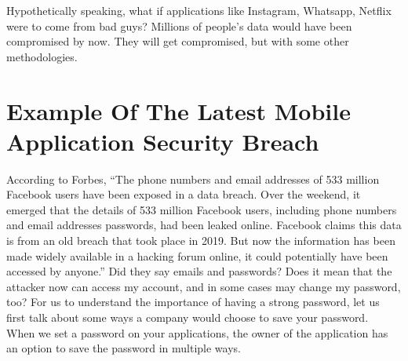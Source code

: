 \documentclass{article}
\begin{document}
Hypothetically speaking, what if applications like Instagram, Whatsapp, Netflix were to come from bad guys? Millions of people’s data would have been compromised by now. They will get compromised, but with some other methodologies.\\

\section{Example Of The Latest Mobile Application Security Breach}
According to Forbes, “The phone numbers and email addresses of 533 million Facebook users have been exposed in a data breach. Over the weekend, it emerged that the details of 533 million Facebook users, including phone numbers and email addresses passwords, had been leaked online. Facebook claims this data is from an old breach that took place in 2019. But now the information has been made widely available in a hacking forum online, it could potentially have been accessed by anyone.” Did they say emails and passwords? Does it mean that the attacker now can access my account, and in some cases may change my password, too? For us to understand the importance of having a strong password, let us first talk about some ways a company would choose to save your password.\\
When we set a password on your applications, the owner of the application has an option to save the password in multiple ways.\\
\end{document}
